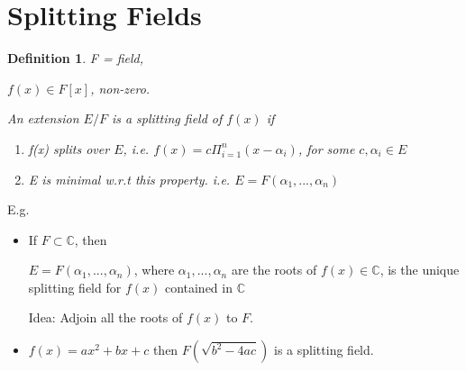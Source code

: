 \documentclass[twoside]{article}
\newcommand{\C}{\mathbb{C}}
\newtheorem{definition}[theorem]{Definition}
\begin{document}
    \section{Splitting Fields}

    \begin{definition}
        F = field,

        $f(x) \in F[x]$, non-zero. 

        An extension $E/F$ is a splitting field of $f(x)$ if 
        \begin{enumerate}
            \item f(x) splits over $E$, i.e. $f(x) = c \Pi_{i=1}^n(x - \alpha_i)$, for some $c, \alpha_i \in E$ 
            \item E is minimal w.r.t this property. i.e. $E = F(\alpha_1,...,\alpha_n)$
        \end{enumerate}
    \end{definition}

    E.g. 
    \begin{itemize}
        \item If $F \subset \C$, then  

        $E = F(\alpha_1, ..., \alpha_n)$, where $\alpha_1, ..., \alpha_n$ are the roots of $f(x) \in \C$, is the unique splitting field for $f(x)$ contained in $\C$

        Idea: Adjoin all the roots of $f(x)$ to $F$.
        \item $f(x) = ax^2 + bx + c$ then 
        $F(\sqrt{b^2 - 4ac})$ is a splitting field. 
    \end{itemize}


    
\end{document}
